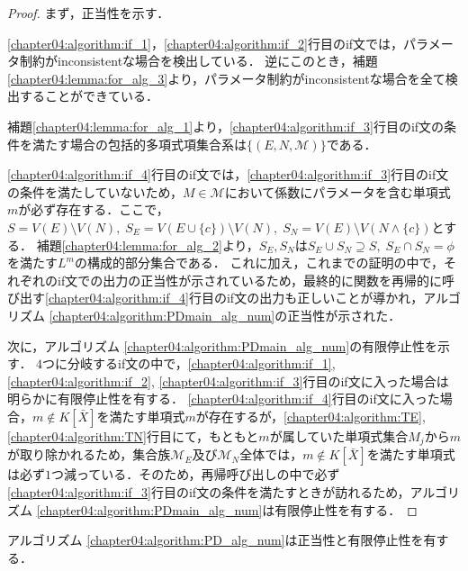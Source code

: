 \begin{proof}
	まず，正当性を示す．
	\par
	\ref{chapter04:algorithm:if_1}，\ref{chapter04:algorithm:if_2}行目のif文では，パラメータ制約がinconsistentな場合を検出している．
	逆にこのとき，補題\ref{chapter04:lemma:for_alg_3}より，パラメータ制約がinconsistentな場合を全て検出することができている．
	\par
	補題\ref{chapter04:lemma:for_alg_1}より，\ref{chapter04:algorithm:if_3}行目のif文の条件を満たす場合の包括的多項式項集合系は$\{(E, N, \mathcal{M})\}$である．
	\par
	\ref{chapter04:algorithm:if_4}行目のif文では，\ref{chapter04:algorithm:if_3}行目のif文の条件を満たしていないため，$M \in \mathcal{M}$において係数にパラメータを含む単項式$m$が必ず存在する．ここで，$S = V(E) \setminus V(N), \; S_E = V(E \cup \{ c \}) \setminus V(N), \; S_N = V(E) \setminus V(N \land \{ c \})$とする．
	補題\ref{chapter04:lemma:for_alg_2}より，$S_E, S_N$は$S_E \cup S_N \supseteq S,\; S_E \cap S_N = \phi$を満たす$L^m$の構成的部分集合である．
	これに加え，これまでの証明の中で，それぞれのif文での出力の正当性が示されているため，最終的に関数を再帰的に呼び出す\ref{chapter04:algorithm:if_4}行目のif文の出力も正しいことが導かれ，アルゴリズム \ref{chapter04:algorithm:PDmain_alg_num}の正当性が示された．
	\par
	次に，アルゴリズム \ref{chapter04:algorithm:PDmain_alg_num}の有限停止性を示す．
	$4$つに分岐するif文の中で，\ref{chapter04:algorithm:if_1}, \ref{chapter04:algorithm:if_2}, \ref{chapter04:algorithm:if_3}行目のif文に入った場合は明らかに有限停止性を有する．
	\ref{chapter04:algorithm:if_4}行目のif文に入った場合，$m \notin K[\bar{X}]$を満たす単項式$m$が存在するが，\ref{chapter04:algorithm:TE}, \ref{chapter04:algorithm:TN}行目にて，もともと$m$が属していた単項式集合$M_j$から$m$が取り除かれるため，集合族$\mathcal{M}_E$及び$\mathcal{M}_N$全体では，$m \notin K[\bar{X}]$を満たす単項式は必ず$1$つ減っている．そのため，再帰呼び出しの中で必ず\ref{chapter04:algorithm:if_3}行目のif文の条件を満たすときが訪れるため，アルゴリズム \ref{chapter04:algorithm:PDmain_alg_num}は有限停止性を有する．
\end{proof}

\begin{corollary}
	アルゴリズム \ref{chapter04:algorithm:PD_alg_num}は正当性と有限停止性を有する．
\end{corollary}







